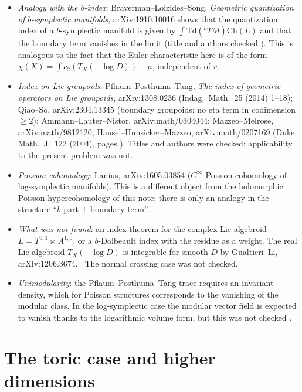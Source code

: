 \begin{rem}
\begin{itemize}
\item \emph{Analogy with the $b$-index}: Braverman--Loizides--Song, \emph{Geometric quantization of $b$-symplectic manifolds}, arXiv:1910.10016 shows that the quantization index of a $b$-symplectic manifold is given by $\int\mathrm{Td}({}^bTM)\mathrm{Ch}(L)$ and that the boundary term vanishes in the limit (title and authors checked \tC). This is analogous to the fact that the Euler characteristic here is of the form $\chi(X)=\int c_2(T_X(-\log D))+\mu$, independent of $r$.
\item \emph{Index on Lie groupoids}: Pflaum--Posthuma--Tang, \emph{The index of geometric operators on Lie groupoids}, arXiv:1308.0236 (Indag.\ Math.\ 25 (2014) 1--18); Qiao--So, arXiv:2304.13345 (boundary groupoids; no eta term in codimension $\ge2$); Ammann--Lauter--Nistor, arXiv:math/0304044; Mazzeo--Melrose, arXiv:math/9812120; Hausel--Hunsicker--Mazzeo, arXiv:math/0207169 (Duke Math.\ J.\ 122 (2004), pages \tQ). Titles and authors were checked; applicability to the present problem was not.
\item \emph{Poisson cohomology}: Lanius, arXiv:1605.03854 ($C^\infty$ Poisson cohomology of log-symplectic manifolds). This is a different object from the holomorphic Poisson hypercohomology of this note; there is only an analogy in the structure ``$b$-part $+$ boundary term''.
\item \emph{What was not found}: an index theorem for the complex Lie algebroid $L=T^{0,1}\bowtie A^{1,0}$, or a $b$-Dolbeault index with the residue as a weight. The real Lie algebroid $T_X(-\log D)$ is integrable for smooth $D$ by Gualtieri--Li, arXiv:1206.3674. \tC\ The normal crossing case was not checked.
\item \emph{Unimodularity}: the Pflaum--Posthuma--Tang trace requires an invariant density, which for Poisson structures corresponds to the vanishing of the modular class. In the log-symplectic case the modular vector field is expected to vanish thanks to the logarithmic volume form, but this was not checked \tQ.
\end{itemize}
\end{rem}

\section{The toric case and higher dimensions}\label{sec:toric}
